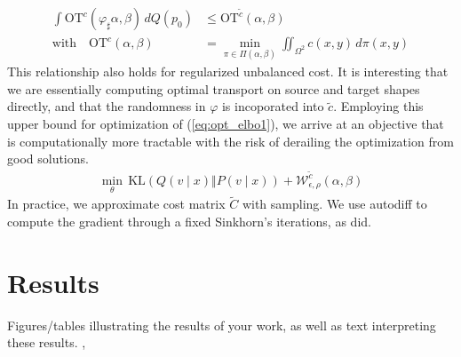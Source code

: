 \documentclass{6838publ}
\newcommand\sW{\ensuremath{\mathcal{W}}}
\begin{document}
\begin{align}
    \int \text{OT}^c(\varphi_\sharp\alpha,\beta) \, dQ(p_0)
        &\leq \text{OT}^{\widetilde{c}}(\alpha,\beta) \\
    \text{with}\quad \text{OT}^c(\alpha,\beta)
        &= \min_{\pi\in\Pi(\alpha,\beta)} \iint_{\Omega^2} c(x, y) \, d\pi(x,y)
\end{align}
This relationship also holds for regularized unbalanced cost. It is interesting that we are essentially computing optimal transport on source and target shapes directly, and that the randomness in $\varphi$ is incoporated into $\widetilde{c}$. Employing this upper bound for optimization of (\ref{eq:opt_elbo1}), we arrive at an objective that is computationally more tractable with the risk of derailing the optimization from good solutions.
\begin{align}
    \min_{\theta}\,
        \text{KL}(Q(v\mid x)\Vert P(v\mid x)) + \sW_{\epsilon,\rho}^{\widetilde{c}}(\alpha,\beta)
    \label{eq:opt_elbo2}
\end{align}
In practice, we approximate cost matrix $\widetilde{C}$ with sampling. We use autodiff to compute the gradient through a fixed Sinkhorn's iterations, as \cite{genevayLearningGenerativeModels2018} did.




\section{Results}

Figures/tables illustrating the results of your work, as well as text interpreting these results. \cite{peyreComputationalOptimalTransport2020},

\newpage
\newpage



\end{document}
